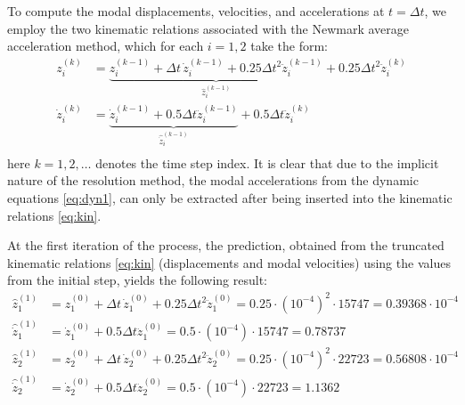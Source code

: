\documentclass[12pt]{article}
\begin{document}
To compute the modal displacements, velocities, and accelerations at $t = \Delta t$, we employ the two kinematic relations associated with the Newmark average acceleration method, which for each $i = 1, 2$ take the form:
\begin{equation}
    \begin{aligned}
        z_i^{(k)}       & = \underbrace{z_i^{(k-1)} + \Delta t \, \dot{z}_i^{(k-1)} + 0.25 \Delta t^2 \ddot{z}_i^{(k-1)} }_\text{$\hat{z}_i^{(k-1)}$}+ 0.25 \Delta t^2\ddot{z}_i^{(k)} \\[10pt]
        \dot{z}_i^{(k)} & = \underbrace{\dot{z}_i^{(k-1)} + 0.5 \Delta t \ddot{z}_i^{(k-1)}}_\text{$\hat{\dot{z}}_i^{(k-1)}$} + 0.5 \Delta t \ddot{z}_i^{(k)}                          \\
    \end{aligned}
    \label{eq:kin}
\end{equation}
here $k = 1, 2, \dots$ denotes the time step index. It is clear that due to the implicit nature of the resolution method, the modal accelerations from the dynamic equations \eqref{eq:dyn1}, can only be extracted after being inserted into the kinematic relations \eqref{eq:kin}.

At the first iteration of the process, the prediction, obtained from the truncated kinematic relations \eqref{eq:kin} (displacements and modal velocities) using the values from the initial step, yields the following result:
\begin{align*}
    \hat{z}_1^{(1)}       & = z_1^{(0)} + \Delta t \, \dot{z}_1^{(0)} + 0.25 \Delta t^2 \ddot{z}_1^{(0)} = 0.25 \cdot (10^{-4})^2 \cdot 15747 = 0.39368 \cdot 10^{-4} \\
    \hat{\dot{z}}_1^{(1)} & = \dot{z}_1^{(0)} + 0.5 \Delta t \ddot{z}_1^{(0)} = 0.5 \cdot (10^{-4}) \cdot 15747 = 0.78737                                             \\
    \hat{z}_2^{(1)}       & = z_2^{(0)} + \Delta t \, \dot{z}_2^{(0)} + 0.25 \Delta t^2 \ddot{z}_2^{(0)} = 0.25 \cdot (10^{-4})^2 \cdot 22723 = 0.56808 \cdot 10^{-4} \\
    \hat{\dot{z}}_2^{(1)} & = \dot{z}_2^{(0)} + 0.5 \Delta t \ddot{z}_2^{(0)} = 0.5 \cdot (10^{-4}) \cdot 22723 = 1.1362
\end{align*}
\end{document}
